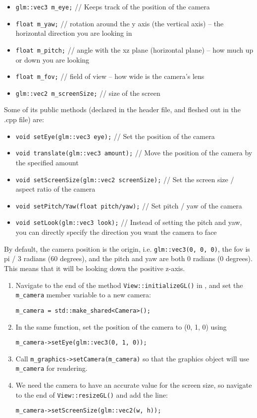 \documentclass{cs195u}
\begin{document}
\begin{itemize}
\item \texttt{glm::vec3 m\_eye;} // Keeps track of the position of the camera
\item  \texttt{float m\_yaw;} // rotation around the y axis (the vertical axis) – the horizontal direction you are looking in

\item  \texttt{float m\_pitch;} // angle with the xz plane (horizontal plane) – how much up or down you are looking
\item  \texttt{float m\_fov;} // field of view – how wide is the camera’s lens
\item  \texttt{glm::vec2 m\_screenSize;} // size of the screen
\end{itemize}

Some of its public methods (declared in the header file, and fleshed out in the .cpp file) are:

\begin{itemize}
\item  \texttt{void setEye(glm::vec3 eye);} // Set the position of the camera
\item  \texttt{void translate(glm::vec3 amount);} // Move the position of the camera by the specified amount
\item  \texttt{void setScreenSize(glm::vec2 screenSize);} // Set the screen size / aspect ratio of the camera
\item  \texttt{void setPitch/Yaw(float pitch/yaw);} // Set pitch / yaw of the camera
\item  \texttt{void setLook(glm::vec3 look);} // Instead of setting the pitch and yaw, you can directly specify the direction you want the camera to face
\end{itemize}

By default, the camera position is the origin, i.e. \texttt{glm::vec3(0, 0, 0)}, the fov is pi / 3 radians (60 degrees), and the pitch and yaw are both 0 radians (0 degrees). This means that it will be looking down the positive z-axis.

\begin{enumerate}
\item  Navigate to the end of the method \texttt{View::initializeGL()} in , and set the \texttt{m\_camera} member variable to a new camera:

\texttt{m\_camera = std::make\_shared<Camera>();}
         
\item  In the same function, set the position of the camera to (0, 1, 0) using 

\texttt{m\_camera->setEye(glm::vec3(0, 1, 0));}

\item  Call \texttt{m\_graphics->setCamera(m\_camera)} so that the graphics object will use \texttt{m\_camera} for rendering.

\item  We need the camera to have an accurate value for the screen size, so navigate to the end of \texttt{View::resizeGL()} and add the line:

        \texttt{m\_camera->setScreenSize(glm::vec2(w, h));} 
\end{enumerate}
\end{document}

